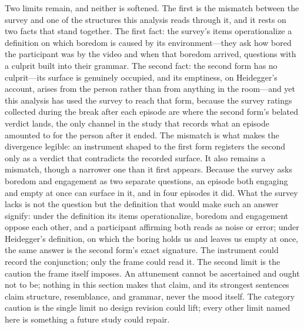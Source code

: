 Two limits remain, and neither is softened. The first is the mismatch between the survey and
one of the structures this analysis reads through it, and it rests on two facts that stand
together. The first fact: the survey's items operationalize a definition on which boredom is
caused by its environment---they ask how bored the participant was by the video and when that
boredom arrived, questions with a culprit built into their grammar. The second fact: the
second form has no culprit---its surface is genuinely occupied, and its emptiness, on
Heidegger's account, arises from the person rather than from anything in the room---and yet
this analysis has used the survey to reach that form, because the survey ratings collected
during the break after each episode are where the second form's belated verdict lands, the
only channel in the study that records what an episode amounted to for the person after it
ended. The mismatch is what makes the divergence legible: an instrument shaped to the first
form registers the second only as a verdict that contradicts the recorded surface. It also
remains a mismatch, though a narrower one than it first appears. Because the survey asks
boredom and engagement as two separate questions, an episode both engaging and empty at once
can surface in it, and in four episodes it did. What the survey lacks is not the question but
the definition that would make such an answer signify: under the definition its items
operationalize, boredom and engagement oppose each other, and a participant affirming both
reads as noise or error; under Heidegger's definition, on which the boring holds us and
leaves us empty at once, the same answer is the second form's exact signature. The instrument
could record the conjunction; only the frame could read it. The second limit
is the caution the frame itself imposes. An attunement cannot be ascertained and ought not to be; nothing in
this section makes that claim, and its strongest sentences claim structure, resemblance, and
grammar, never the mood itself. The category caution is the single limit no design revision
could lift; every other limit named here is something a future study could repair.
